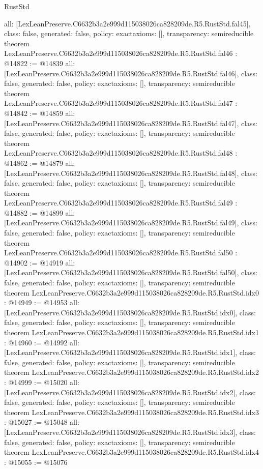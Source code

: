\begin{lexlean}{RustStd}
\begin{coremodule}
{  all: [LexLeanPreserve.C6632b3a2e999d115038026ca828209de.R5.RustStd.fal45],
  class: false,
  generated: false,
  policy: exact{axioms: []},
  transparency: semireducible
}
theorem LexLeanPreserve.C6632b3a2e999d115038026ca828209de.R5.RustStd.fal46 : @14822 := @14839 {
  all: [LexLeanPreserve.C6632b3a2e999d115038026ca828209de.R5.RustStd.fal46],
  class: false,
  generated: false,
  policy: exact{axioms: []},
  transparency: semireducible
}
theorem LexLeanPreserve.C6632b3a2e999d115038026ca828209de.R5.RustStd.fal47 : @14842 := @14859 {
  all: [LexLeanPreserve.C6632b3a2e999d115038026ca828209de.R5.RustStd.fal47],
  class: false,
  generated: false,
  policy: exact{axioms: []},
  transparency: semireducible
}
theorem LexLeanPreserve.C6632b3a2e999d115038026ca828209de.R5.RustStd.fal48 : @14862 := @14879 {
  all: [LexLeanPreserve.C6632b3a2e999d115038026ca828209de.R5.RustStd.fal48],
  class: false,
  generated: false,
  policy: exact{axioms: []},
  transparency: semireducible
}
theorem LexLeanPreserve.C6632b3a2e999d115038026ca828209de.R5.RustStd.fal49 : @14882 := @14899 {
  all: [LexLeanPreserve.C6632b3a2e999d115038026ca828209de.R5.RustStd.fal49],
  class: false,
  generated: false,
  policy: exact{axioms: []},
  transparency: semireducible
}
theorem LexLeanPreserve.C6632b3a2e999d115038026ca828209de.R5.RustStd.fal50 : @14902 := @14919 {
  all: [LexLeanPreserve.C6632b3a2e999d115038026ca828209de.R5.RustStd.fal50],
  class: false,
  generated: false,
  policy: exact{axioms: []},
  transparency: semireducible
}
theorem LexLeanPreserve.C6632b3a2e999d115038026ca828209de.R5.RustStd.idx0 : @14949 := @14953 {
  all: [LexLeanPreserve.C6632b3a2e999d115038026ca828209de.R5.RustStd.idx0],
  class: false,
  generated: false,
  policy: exact{axioms: []},
  transparency: semireducible
}
theorem LexLeanPreserve.C6632b3a2e999d115038026ca828209de.R5.RustStd.idx1 : @14960 := @14992 {
  all: [LexLeanPreserve.C6632b3a2e999d115038026ca828209de.R5.RustStd.idx1],
  class: false,
  generated: false,
  policy: exact{axioms: []},
  transparency: semireducible
}
theorem LexLeanPreserve.C6632b3a2e999d115038026ca828209de.R5.RustStd.idx2 : @14999 := @15020 {
  all: [LexLeanPreserve.C6632b3a2e999d115038026ca828209de.R5.RustStd.idx2],
  class: false,
  generated: false,
  policy: exact{axioms: []},
  transparency: semireducible
}
theorem LexLeanPreserve.C6632b3a2e999d115038026ca828209de.R5.RustStd.idx3 : @15027 := @15048 {
  all: [LexLeanPreserve.C6632b3a2e999d115038026ca828209de.R5.RustStd.idx3],
  class: false,
  generated: false,
  policy: exact{axioms: []},
  transparency: semireducible
}
theorem LexLeanPreserve.C6632b3a2e999d115038026ca828209de.R5.RustStd.idx4 : @15055 := @15076 {
}
\end{coremodule}
\end{lexlean}
